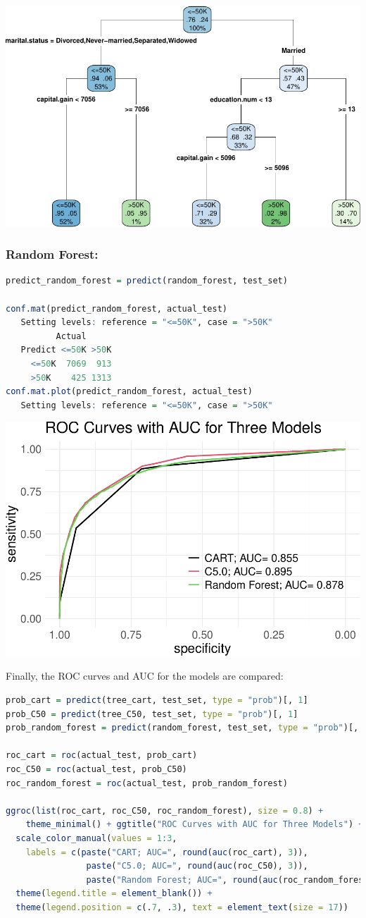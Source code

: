 \documentclass[
]{book}
\theoremstyle{definition}
\theoremstyle{definition}
\theoremstyle{definition}
\theoremstyle{definition}
\theoremstyle{remark}
\begin{document}
\begin{center}\includegraphics[width=0.3\linewidth]{tree_files/figure-latex/unnamed-chunk-12-1} \end{center}

\subsubsection*{Random Forest:}\label{random-forest-1}

\begin{lstlisting}[language=R]
predict_random_forest = predict(random_forest, test_set)

conf.mat(predict_random_forest, actual_test)
   Setting levels: reference = "<=50K", case = ">50K"
          Actual
   Predict <=50K >50K
     <=50K  7069  913
     >50K    425 1313
conf.mat.plot(predict_random_forest, actual_test)
   Setting levels: reference = "<=50K", case = ">50K"
\end{lstlisting}

\begin{center}\includegraphics[width=0.3\linewidth]{tree_files/figure-latex/unnamed-chunk-13-1} \end{center}

Finally, the ROC curves and AUC for the models are compared:

\begin{lstlisting}[language=R]
prob_cart = predict(tree_cart, test_set, type = "prob")[, 1]
prob_C50 = predict(tree_C50, test_set, type = "prob")[, 1]
prob_random_forest = predict(random_forest, test_set, type = "prob")[, 1]

roc_cart = roc(actual_test, prob_cart)
roc_C50 = roc(actual_test, prob_C50)
roc_random_forest = roc(actual_test, prob_random_forest)

ggroc(list(roc_cart, roc_C50, roc_random_forest), size = 0.8) + 
    theme_minimal() + ggtitle("ROC Curves with AUC for Three Models") +
  scale_color_manual(values = 1:3, 
    labels = c(paste("CART; AUC=", round(auc(roc_cart), 3)), 
                paste("C5.0; AUC=", round(auc(roc_C50), 3)), 
                paste("Random Forest; AUC=", round(auc(roc_random_forest), 3)))) +
  theme(legend.title = element_blank()) +
  theme(legend.position = c(.7, .3), text = element_text(size = 17))
\end{lstlisting}
\end{document}
